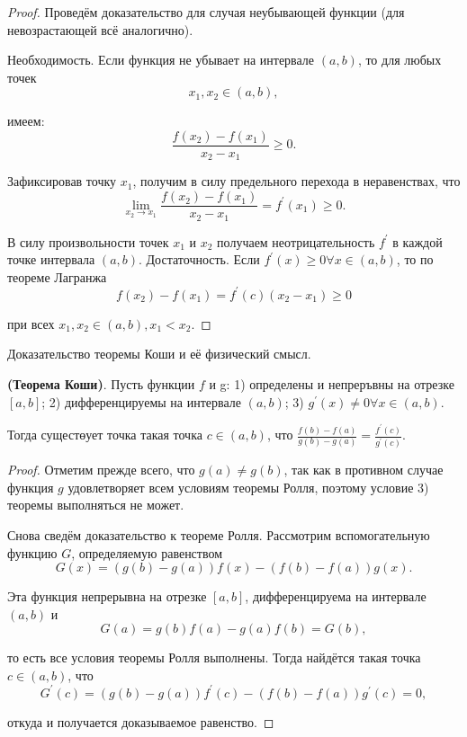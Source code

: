 \begin{proof}
    Проведём доказательство для случая неубывающей функции (для невозрастающей всё аналогично).

    Необходимость. Если функция не убывает на интервале $(a, b)$, то для любых точек
    $$
        x_1, x_2 \in(a, b),
    $$

    имеем:
    $$
        \frac{f\left(x_2\right)-f\left(x_1\right)}{x_2-x_1} \geq 0 .
    $$

    Зафиксировав точку $x_1$, получим в силу предельного перехода в неравенствах, что
    $$
        \lim _{x_2 \rightarrow x_1} \frac{f\left(x_2\right)-f\left(x_1\right)}{x_2-x_1}=f^{\prime}\left(x_1\right) \geq 0 .
    $$

    В силу произвольности точек $x_1$ и $x_2$ получаем неотрицательность $f^{\prime}$ в каждой точке интервала $(a, b)$.
    Достаточность. Если $f^{\prime}(x) \geq 0 \forall x \in(a, b)$, то по теореме Лагранжа
    $$
        f\left(x_2\right)-f\left(x_1\right)=f^{\prime}(c)\left(x_2-x_1\right) \geq 0
    $$

    при всех $x_1, x_2 \in(a, b), x_1<x_2$.
\end{proof}

\newpage

\begin{problem}
Доказательство теоремы Коши и её физический смысл.
\end{problem}
\begin{theorem}\textbf{(Теорема Коши)}.
    Пусть функции $f$ и g:
    1) определены и непреръвны на отрезке $[a, b]$;
    2) дифференцируемы на интервале $(a, b)$;
    3) $g^{\prime}(x) \neq 0 \forall x \in(a, b)$.

    Тогда сущестөует точка такая точка $c \in(a, b)$, что $\frac{f(b)-f(a)}{g(b)-g(a)}=\frac{f^{\prime}(c)}{g^{\prime}(c)}$.
\end{theorem}
\begin{proof}
    Отметим прежде всего, что $g(a) \neq g(b)$, так как в противном случае функция $g$ удовлетворяет всем условиям теоремы Ролля, поэтому условие 3) теоремы выполняться не может.

    Снова сведём доказательство к теореме Ролля. Рассмотрим вспомогательную функцию $G$, определяемую равенством
    $$
        G(x)=(g(b)-g(a)) f(x)-(f(b)-f(a)) g(x) .
    $$

    Эта функция непрерывна на отрезке $[a, b]$, дифференцируема на интервале $(a, b)$ и
    $$
        G(a)=g(b) f(a)-g(a) f(b)=G(b),
    $$

    то есть все условия теоремы Ролля выполнены. Тогда найдётся такая точка $c \in(a, b)$, что
    $$
        G^{\prime}(c)=(g(b)-g(a)) f^{\prime}(c)-(f(b)-f(a)) g^{\prime}(c)=0,
    $$

    откуда и получается доказываемое равенство.
\end{proof}


